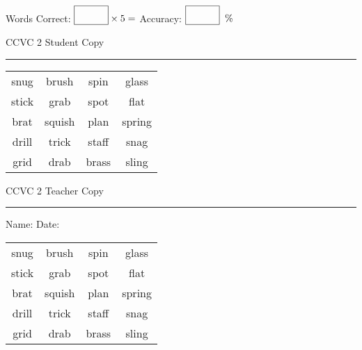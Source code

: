 \documentclass{memoir}
\begin{document}
\normalsize

Words Correct: $\fbox{\phantom{\huge 100}} \times 5 = $ Accuracy: $\fbox{\phantom{\huge 100}}\;\; \%$ 

\vfill

\newpage


\footnotesize \noindent
CCVC 2 \hfill Student Copy
\smallskip
\hrule

\Large

\setlength{\tabcolsep}{14pt}
\def\arraystretch{3}

{\selectfont


\begin{vplace}[0.5]
\begin{center}
\begin{tabular}{cccc}
snug & brush & spin & glass \\
stick & grab                    & spot & flat             \\
brat               & squish & plan & spring \\
drill & trick & staff            & snag \\
grid & drab             & brass       & sling \\
\end{tabular}
\end{center}
\end{vplace}

}

\newpage

\footnotesize \noindent
CCVC 2 \hfill Teacher Copy
\smallskip
\hrule

\normalsize

\vfill

\noindent
Name: \underline{\hspace{1.75in}} \hfill Date: \underline{\hspace{1in}}

\Large

{\selectfont


\begin{vplace}[0.5]
\begin{center}
\begin{tabular}{cccc}
snug & brush & spin & glass \\
stick & grab                    & spot & flat             \\
brat               & squish & plan & spring \\
drill & trick & staff            & snag \\
grid & drab             & brass       & sling \\
\end{tabular}
\end{center}
\end{vplace}



}
\end{document}
